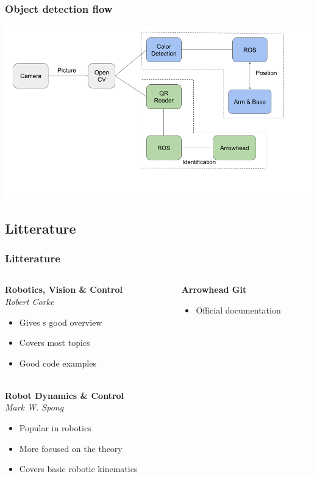 \documentclass{beamer}
\begin{document}
\begin{frame}
    \frametitle{Object detection flow}
    \includegraphics[width=\textwidth]{img/vision_flow.png}
\end{frame}


\begin{frame}
    \subsection{Litterature}
    \frametitle{Litterature}

    \begin{columns}
        \begin{column}[]{0.5\textwidth}
            \textbf{Robotics, Vision \& Control }\\
            \textit{Robert Corke}
            \begin{itemize}
                \item Gives s good overview
                \item Covers most topics
                \item Good code examples\\~\
            \end{itemize}
            \textbf{Robot Dynamics \& Control}\\
            \textit{Mark W. Spong}
            \begin{itemize}
                \item Popular in robotics
                \item More focused on the theory
                \item Covers basic robotic kinematics
            \end{itemize}

        \end{column}
        
        \begin{column}[]{.5\textwidth}
            \textbf{Arrowhead Git}
            \begin{itemize}
                \item Official documentation
            \end{itemize}
        \end{column}
        

    \end{columns}
\end{frame}
\end{document}
